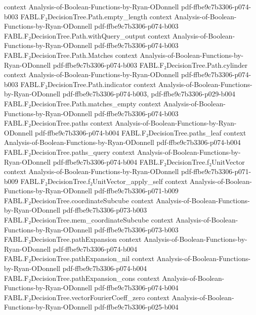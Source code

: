 \begin{theorem}
  {context}
  {Analysis-of-Boolean-Functions-by-Ryan-ODonnell}
  {pdf-ffbe9c7b3306-p074-b003}
\proofstep
  {FABL.F₂DecisionTree.Path.empty_length}
  {context}
  {Analysis-of-Boolean-Functions-by-Ryan-ODonnell}
  {pdf-ffbe9c7b3306-p074-b003}
\proofstep
  {FABL.F₂DecisionTree.Path.withQuery_output}
  {context}
  {Analysis-of-Boolean-Functions-by-Ryan-ODonnell}
  {pdf-ffbe9c7b3306-p074-b003}
\proofstep
  {FABL.F₂DecisionTree.Path.Matches}
  {context}
  {Analysis-of-Boolean-Functions-by-Ryan-ODonnell}
  {pdf-ffbe9c7b3306-p074-b003}
\proofstep
  {FABL.F₂DecisionTree.Path.cylinder}
  {context}
  {Analysis-of-Boolean-Functions-by-Ryan-ODonnell}
  {pdf-ffbe9c7b3306-p074-b003}
\proofstep
  {FABL.F₂DecisionTree.Path.indicator}
  {context}
  {Analysis-of-Boolean-Functions-by-Ryan-ODonnell}
  {pdf-ffbe9c7b3306-p074-b003,
    pdf-ffbe9c7b3306-p029-b004}
\proofstep
  {FABL.F₂DecisionTree.Path.matches_empty}
  {context}
  {Analysis-of-Boolean-Functions-by-Ryan-ODonnell}
  {pdf-ffbe9c7b3306-p074-b003}
\proofstep
  {FABL.F₂DecisionTree.paths}
  {context}
  {Analysis-of-Boolean-Functions-by-Ryan-ODonnell}
  {pdf-ffbe9c7b3306-p074-b004}
\proofstep
  {FABL.F₂DecisionTree.paths_leaf}
  {context}
  {Analysis-of-Boolean-Functions-by-Ryan-ODonnell}
  {pdf-ffbe9c7b3306-p074-b004}
\proofstep
  {FABL.F₂DecisionTree.paths_query}
  {context}
  {Analysis-of-Boolean-Functions-by-Ryan-ODonnell}
  {pdf-ffbe9c7b3306-p074-b004}
\proofstep
  {FABL.F₂DecisionTree.f₂UnitVector}
  {context}
  {Analysis-of-Boolean-Functions-by-Ryan-ODonnell}
  {pdf-ffbe9c7b3306-p071-b009}
\proofstep
  {FABL.F₂DecisionTree.f₂UnitVector_apply_self}
  {context}
  {Analysis-of-Boolean-Functions-by-Ryan-ODonnell}
  {pdf-ffbe9c7b3306-p071-b009}
\proofstep
  {FABL.F₂DecisionTree.coordinateSubcube}
  {context}
  {Analysis-of-Boolean-Functions-by-Ryan-ODonnell}
  {pdf-ffbe9c7b3306-p073-b003}
\proofstep
  {FABL.F₂DecisionTree.mem_coordinateSubcube}
  {context}
  {Analysis-of-Boolean-Functions-by-Ryan-ODonnell}
  {pdf-ffbe9c7b3306-p073-b003}
\proofstep
  {FABL.F₂DecisionTree.pathExpansion}
  {context}
  {Analysis-of-Boolean-Functions-by-Ryan-ODonnell}
  {pdf-ffbe9c7b3306-p074-b004}
\proofstep
  {FABL.F₂DecisionTree.pathExpansion_nil}
  {context}
  {Analysis-of-Boolean-Functions-by-Ryan-ODonnell}
  {pdf-ffbe9c7b3306-p074-b004}
\proofstep
  {FABL.F₂DecisionTree.pathExpansion_cons}
  {context}
  {Analysis-of-Boolean-Functions-by-Ryan-ODonnell}
  {pdf-ffbe9c7b3306-p074-b004}
\proofstep
  {FABL.F₂DecisionTree.vectorFourierCoeff_zero}
  {context}
  {Analysis-of-Boolean-Functions-by-Ryan-ODonnell}
  {pdf-ffbe9c7b3306-p025-b004}

\end{theorem}
